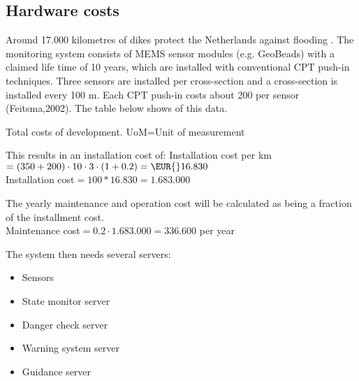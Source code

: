 \subsection{Hardware costs}
Around 17.000 kilometres of dikes protect the Netherlands against flooding \cite{DMC}. 
The monitoring system consists of MEMS sensor modules (e.g. GeoBeads) with a claimed life time of 10 years, which are installed with conventional CPT push-in techniques. Three sensors are installed per cross-section and a cross-section is installed every 100 m.
Each CPT push-in costs about \EUR{}200 per sensor (Feitsma,2002)\cite{TUDelftPHD}.%
The table below shows of this data.
\begin{table}[H]
\label{table:total-dev-costs2}
\caption{Total costs of development. UoM=Unit of measurement}
\end{table}

This results in an installation cost of:
Installation cost per km$=(350+200)\cdot10\cdot3\cdot(1+0.2)=\EUR{}16.830$\\
Installation cost$=100*16.830=1.683.000$

\newcommand{\installationCosts}{1.683.000}

The yearly maintenance and operation cost will be calculated as being a fraction of the installment cost.\\ 
Maintenance cost$=0.2\cdot1.683.000=336.600$ per year %

The system then needs several servers:
\begin{itemize}
	\item Sensors
	\item {State monitor server}
	\item {Danger check server}	
	\item {Warning system server}	
	\item {Guidance server}	
\end{itemize}

